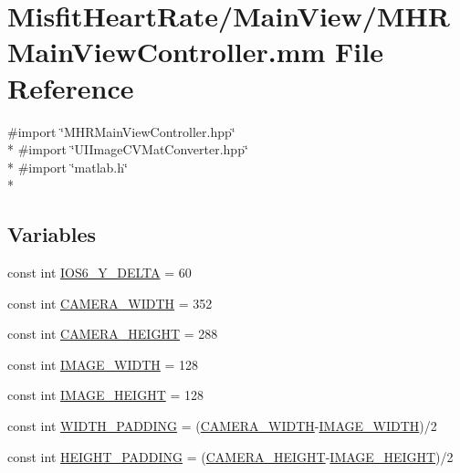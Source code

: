 \hypertarget{_m_h_r_main_view_controller_8mm}{\section{Misfit\+Heart\+Rate/\+Main\+View/\+M\+H\+R\+Main\+View\+Controller.mm File Reference}
\label{_m_h_r_main_view_controller_8mm}
}
{\ttfamily \#import \char`\"{}M\+H\+R\+Main\+View\+Controller.\+hpp\char`\"{}}\\*
{\ttfamily \#import \char`\"{}U\+I\+Image\+C\+V\+Mat\+Converter.\+hpp\char`\"{}}\\*
{\ttfamily \#import \char`\"{}matlab.\+h\char`\"{}}\\*
\subsection*{Variables}
\begin{DoxyCompactItemize}
\item 
const int \hyperlink{_m_h_r_main_view_controller_8mm_a2cedb8dbc416f03a7e9d6e9533043773}{I\+O\+S6\+\_\+\+Y\+\_\+\+D\+E\+L\+T\+A} = 60
\item 
const int \hyperlink{_m_h_r_main_view_controller_8mm_a964d7f0fc9e80567acdcdff8d0b68b4a}{C\+A\+M\+E\+R\+A\+\_\+\+W\+I\+D\+T\+H} = 352
\item 
const int \hyperlink{_m_h_r_main_view_controller_8mm_abbbac9562c51eabfa14609a91464eb1c}{C\+A\+M\+E\+R\+A\+\_\+\+H\+E\+I\+G\+H\+T} = 288
\item 
const int \hyperlink{_m_h_r_main_view_controller_8mm_a86e681b82b6df52d2edfcd3361ef7ef2}{I\+M\+A\+G\+E\+\_\+\+W\+I\+D\+T\+H} = 128
\item 
const int \hyperlink{_m_h_r_main_view_controller_8mm_ac30c65321e99b04ebbdcdda7c2fac426}{I\+M\+A\+G\+E\+\_\+\+H\+E\+I\+G\+H\+T} = 128
\item 
const int \hyperlink{_m_h_r_main_view_controller_8mm_a3f33c36bfbff665a75263b4578776a71}{W\+I\+D\+T\+H\+\_\+\+P\+A\+D\+D\+I\+N\+G} = (\hyperlink{_m_h_r_main_view_controller_8mm_a964d7f0fc9e80567acdcdff8d0b68b4a}{C\+A\+M\+E\+R\+A\+\_\+\+W\+I\+D\+T\+H}-\/\hyperlink{_m_h_r_main_view_controller_8mm_a86e681b82b6df52d2edfcd3361ef7ef2}{I\+M\+A\+G\+E\+\_\+\+W\+I\+D\+T\+H})/2
\item 
const int \hyperlink{_m_h_r_main_view_controller_8mm_a024d8577f09294f908fb4431519650d8}{H\+E\+I\+G\+H\+T\+\_\+\+P\+A\+D\+D\+I\+N\+G} = (\hyperlink{_m_h_r_main_view_controller_8mm_abbbac9562c51eabfa14609a91464eb1c}{C\+A\+M\+E\+R\+A\+\_\+\+H\+E\+I\+G\+H\+T}-\/\hyperlink{_m_h_r_main_view_controller_8mm_ac30c65321e99b04ebbdcdda7c2fac426}{I\+M\+A\+G\+E\+\_\+\+H\+E\+I\+G\+H\+T})/2
\end{DoxyCompactItemize}


